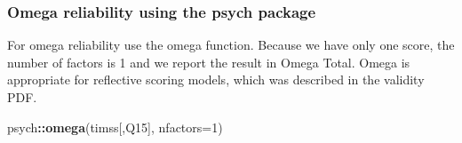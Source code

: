 \documentclass[
]{article}
\newenvironment{Shaded}{\begin{snugshade}}{\end{snugshade}}
\newcommand{\DataTypeTok}[1]{\textcolor[rgb]{0.13,0.29,0.53}{#1}}
\newcommand{\DecValTok}[1]{\textcolor[rgb]{0.00,0.00,0.81}{#1}}
\newcommand{\KeywordTok}[1]{\textcolor[rgb]{0.13,0.29,0.53}{\textbf{#1}}}
\newcommand{\NormalTok}[1]{#1}
\newcommand{\OperatorTok}[1]{\textcolor[rgb]{0.81,0.36,0.00}{\textbf{#1}}}
\begin{document}
\hypertarget{omega-reliability-using-the-psych-package}{%
\subsubsection{Omega reliability using the psych package}\label{omega-reliability-using-the-psych-package}}

For omega reliability use the omega function. Because we have only one score, the number of factors is 1 and we report the result in Omega Total. Omega is appropriate for reflective scoring models,
which was described in the validity PDF.

\begin{Shaded}
\begin{Highlighting}[]
\NormalTok{psych}\OperatorTok{::}\KeywordTok{omega}\NormalTok{(timss[,Q15], }\DataTypeTok{nfactors=}\DecValTok{1}\NormalTok{)}
\end{Highlighting}
\end{Shaded}
\end{document}
